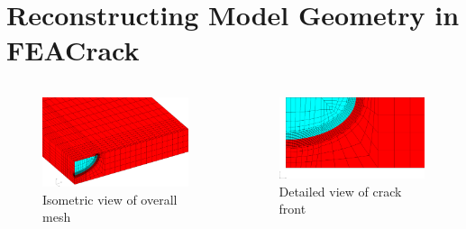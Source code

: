\section{Reconstructing Model Geometry in FEACrack}

\begin{frame}
\begin{columns}
\begin{column}{0.45\textwidth}
\begin{figure}[tbp]
\centering
\includegraphics[width=\columnwidth]{mesh-iso}
\caption{\label{fig:mesh-iso} Isometric view of overall mesh}
\end{figure}
\end{column}
\begin{column}{0.45\textwidth}
\begin{figure}[tbp]
\centering
\includegraphics[width=\columnwidth]{mesh-front}
\caption{\label{fig:mesh-front} Detailed view of crack front}
\end{figure}
\end{column}
\end{columns}
\end{frame}

